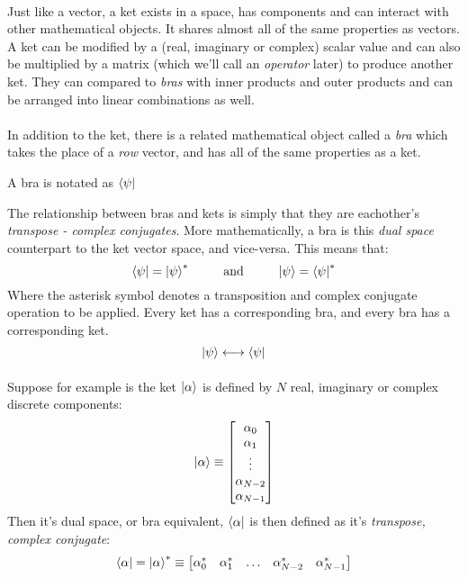 \documentclass[12pt,letterpaper]{book}
\begin{document}
\paragraph*{}Just like a vector, a ket exists in a space, has components and can interact with other mathematical objects. It shares almost all of the same properties as vectors. A ket can be modified by a (real, imaginary or complex) scalar value and can also be multiplied by a matrix (which we'll call an \textit{operator} later) to produce another ket. They can compared to \textit{bras} with inner products and outer products and can be arranged into linear combinations as well.

\paragraph*{}In addition to the ket, there is a related mathematical object called a \textit{bra} which takes the place of a \textit{row} vector, and has all of the same properties as a ket.
\begin{center}
A bra is notated as $\bra{\psi}$
\end{center}
The relationship between bras and kets is simply that they are eachother's \textit{transpose - complex conjugates}. More mathematically, a bra is this \textit{dual space} counterpart to the ket vector space, and vice-versa. This means that:
\begin{equation}
\label{bra-ket relation}
\bra{\psi} = \ket{\psi}^* 
\text{\hspace*{8mm} and \hspace*{8mm}} 
\ket{\psi} = \bra{\psi}^*
\end{equation}
Where the asterisk symbol denotes a transposition and complex conjugate operation to be applied. Every ket has a corresponding bra, and every bra has a corresponding ket.
\begin{equation}
\ket{\psi} \longleftrightarrow \bra{\psi}
\end{equation}

\paragraph*{}Suppose for example is the ket $\ket{\alpha}$ is defined by $N$ real, imaginary or complex discrete components:
\begin{equation}
\label{discrete ket}
\ket{\alpha} \equiv
\begin{bmatrix}
\alpha_0 \\ \alpha_1 \\ \vdots \\ \alpha_{N-2} \\ \alpha_{N-1}
\end{bmatrix}
\end{equation}
Then it's dual space, or bra equivalent, $\bra{\alpha}$ is then defined as it's  \textit{transpose, complex conjugate}:
\begin{equation}
\label{discrete bra}
\bra{\alpha} = 
\ket{\alpha}^* \equiv
\begin{bmatrix}
\alpha^*_0 & \alpha^*_1 & \hdots &\alpha^*_{N-2} & \alpha^*_{N-1}
\end{bmatrix}
\end{equation}
\end{document}
